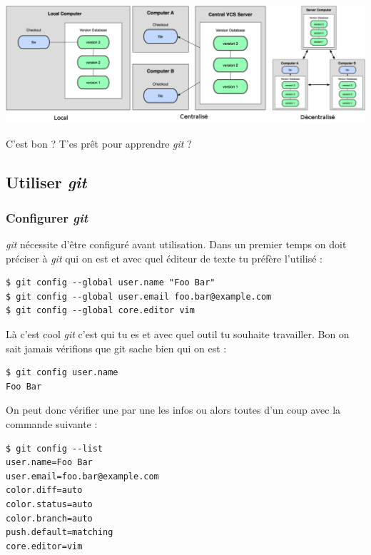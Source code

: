 \documentclass[12pt,a4paper]{article}
\begin{document}
\begin{center}
\includegraphics[width=\linewidth]{gest}
\end{center}

C'est bon ? T'es prêt pour apprendre \emph{git} ?

\newpage

\subsection{Utiliser \emph{git}}

\subsubsection{Configurer \emph{git}}

\emph{git} nécessite d'être configuré avant utilisation. Dans un premier temps on doit préciser à \emph{git} qui on est et avec quel éditeur de texte tu préfère l'utilisé :

\begin{verbatim}
$ git config --global user.name "Foo Bar"
$ git config --global user.email foo.bar@example.com
$ git config --global core.editor vim
\end{verbatim}

Là c'est cool \emph{git} c'est qui tu es et avec quel outil tu souhaite travailler. Bon on sait jamais vérifions que git sache bien qui on est :

\begin{verbatim}
$ git config user.name
Foo Bar
\end{verbatim}

On peut donc vérifier une par une les infos ou alors toutes d'un coup avec la commande suivante :

\begin{verbatim}
$ git config --list
user.name=Foo Bar
user.email=foo.bar@example.com
color.diff=auto
color.status=auto
color.branch=auto
push.default=matching
core.editor=vim
\end{verbatim}
\end{document}
